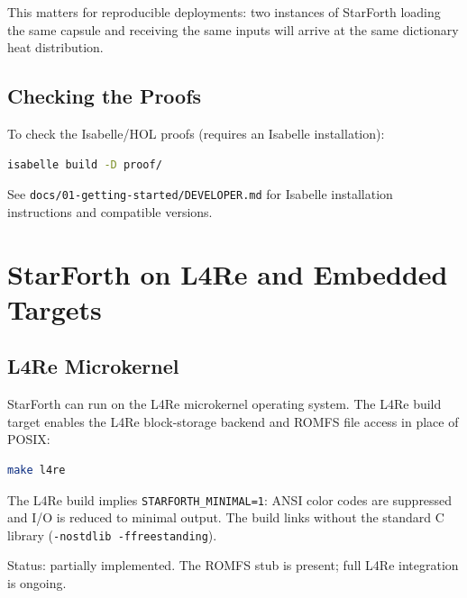This matters for reproducible deployments: two instances of StarForth loading
the same capsule and receiving the same inputs will arrive at the same
dictionary heat distribution.

\section{Checking the Proofs}
\label{sec:checking-proofs}

To check the Isabelle/HOL proofs (requires an Isabelle installation):

\begin{lstlisting}[language=bash]
isabelle build -D proof/
\end{lstlisting}

See \texttt{docs/01-getting-started/DEVELOPER.md} for Isabelle installation
instructions and compatible versions.

\chapter{StarForth on L4Re and Embedded Targets}
\label{chap:l4re}

\section{L4Re Microkernel}
\label{sec:l4re}

StarForth can run on the L4Re microkernel operating system. The L4Re build
target enables the L4Re block-storage backend and ROMFS file access in place
of POSIX:

\begin{lstlisting}[language=bash]
make l4re
\end{lstlisting}

The L4Re build implies \texttt{STARFORTH\_MINIMAL=1}: ANSI color codes are
suppressed and I/O is reduced to minimal output. The build links without the
standard C library (\texttt{-nostdlib -ffreestanding}).

Status: partially implemented. The ROMFS stub is present; full L4Re integration
is ongoing.

